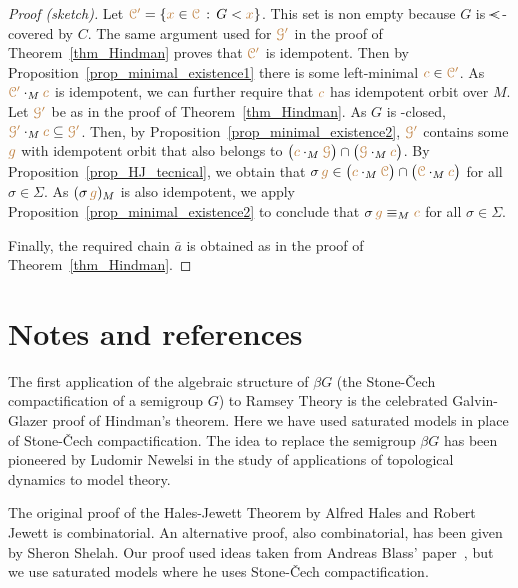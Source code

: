 \documentclass[creche.tex]{subfiles}
\begin{document}
\begin{grigio}
\begin{proof}[Proof (sketch)]
Let ${\color{brown}\EuScript C'}=\{{\color{brown} x}\in{\color{brown}\EuScript C}\,:\,G<{\color{brown} x}\}$.
This set is non empty because $G$ is $\rela$-covered by $C$.
The same argument used for ${\color{brown}\EuScript G'}$ in the proof of Theorem~\ref{thm_Hindman} proves that ${\color{brown}\EuScript C'}$ is idempotent.
Then by Proposition~\ref{prop_minimal_existence1} there is some left-minimal ${\color{brown} c}\in{\color{brown}\EuScript C'}$.
As ${\color{brown}\EuScript C'}\cdot_M{\color{brown} c}$ is idempotent, we can further require that ${\color{brown} c}$ has idempotent orbit over $M$.
Let ${\color{brown}\EuScript G'}$ be as in the proof of Theorem~\ref{thm_Hindman}.
As $G$ is  \reladot-closed, ${\color{brown}\EuScript G'}\cdot_M{\color{brown} c}\subseteq{\color{brown}\EuScript G'}$.
Then, by Proposition~\ref{prop_minimal_existence2}, 
${\color{brown}\EuScript G'}$ contains some ${\color{brown} g}$ with idempotent orbit that also belongs to 
$\big({\color{brown} c}\cdot_M{\color{brown}\EuScript G}\big)\cap\big({\color{brown}\EuScript G}\cdot_M{\color{brown} c}\big)$.
By Proposition~\ref{prop_HJ_tecnical}, we obtain that
$\sigma\,{\color{brown} g}\in\big({\color{brown} c}\cdot_M{\color{brown}\EuScript C}\big)\cap\big({\color{brown}\EuScript C}\cdot_M{\color{brown} c}\big)$
for all $\sigma\in\Sigma$.
As $(\sigma\,{\color{brown} g})_M$ is also idempotent, 
we apply Proposition~\ref{prop_minimal_existence2} to conclude that 
$\sigma\,{\color{brown} g}\equiv_M{\color{brown} c}$ for all $\sigma\in\Sigma$.

Finally, the required chain $\bar a$ is obtained as in the proof of Theorem~\ref{thm_Hindman}.
\end{proof}
\end{grigio}

\section{Notes and references}

The first application of the algebraic structure of $\beta G$ 
(the Stone-\v{C}ech compactification of a semigroup $G$) 
to Ramsey Theory is the celebrated Galvin-Glazer proof of Hindman's theorem. 
Here we have used saturated models in place of Stone-\v{C}ech compactification.
The idea to replace the semigroup $\beta G$  has been pioneered by Ludomir Newelsi
in the study of applications of topological dynamics to model theory. 

The original proof of the Hales-Jewett Theorem by Alfred Hales and Robert Jewett is combinatorial.
An alternative proof, also combinatorial, has been given by Sheron Shelah.
Our proof used ideas taken from Andreas Blass' paper~\cite{Blass}, but we use saturated models where he uses Stone-\v{C}ech compactification.


\begin{biblist}[]\normalsize


\end{biblist}
\end{document}
